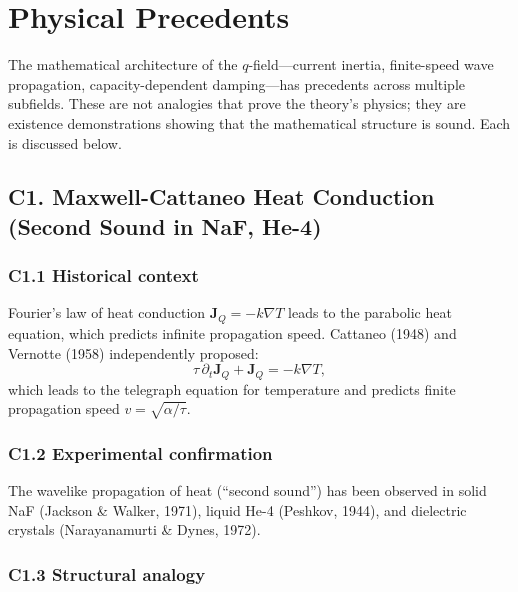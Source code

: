 \documentclass[reprint]{revtex4-2}
\begin{document}
\section{Physical Precedents}

The mathematical architecture of the $q$-field---current inertia, finite-speed wave propagation, capacity-dependent damping---has precedents across multiple subfields. These are not analogies that prove the theory's physics; they are existence demonstrations showing that the mathematical structure is sound. Each is discussed below.

\subsection{C1. Maxwell-Cattaneo Heat Conduction (Second Sound in NaF, He-4)}

\subsubsection{C1.1 Historical context}

Fourier's law of heat conduction $\mathbf{J}_Q = -k\nabla T$ leads to the parabolic heat equation, which predicts infinite propagation speed. Cattaneo (1948) and Vernotte (1958) independently proposed:
\begin{equation}
\tau\,\partial_t\mathbf{J}_Q + \mathbf{J}_Q = -k\nabla T,
\end{equation}
which leads to the telegraph equation for temperature and predicts finite propagation speed $v = \sqrt{\alpha/\tau}$.

\subsubsection{C1.2 Experimental confirmation}

The wavelike propagation of heat (``second sound'') has been observed in solid NaF (Jackson \& Walker, 1971), liquid He-4 (Peshkov, 1944), and dielectric crystals (Narayanamurti \& Dynes, 1972).

\subsubsection{C1.3 Structural analogy}
\end{document}
